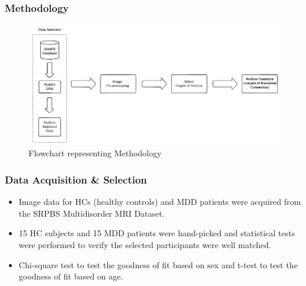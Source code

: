 \documentclass{beamer}
\begin{document}
  \begin{frame}[t]
    \frametitle{Methodology}

    \begin{figure}[H]
      \centering
      \includegraphics[width=\textwidth]{methodology-flowchart.png}
      \caption{Flowchart representing Methodology}
    \end{figure}

  \end{frame}

  \begin{frame}[t]
    \frametitle{Data Acquisition \& Selection }
      \vskip 20pt

    \begin{itemize}

    \item Image data for HCs (healthy controls) and MDD patients were
      acquired from the SRPBS Multidisorder MRI Dataset. \vskip 10pt

    \item 15 HC subjects and 15 MDD patients were hand-picked and
      statistical tests were performed to verify the selected
        participants were well matched. \vskip 10pt

    \item Chi-square test to test the goodness of fit based on sex and
      t-test to test the goodness of fit based on age.

    \end{itemize}

  \end{frame}
\end{document}
